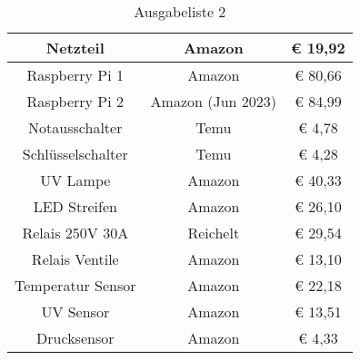 \begin{table}[H]
\vspace{10mm}
    \centering
    \begin{tabular}{ | c | c | c | } 
  \hline
   Netzteil	&Amazon	&€ 19,92\\ 
\hline
 Raspberry Pi 1	&Amazon	&€ 80,66 \\ 
  \hline
  Raspberry Pi 2	&Amazon (Jun 2023)	&€ 84,99\\ 
  \hline
   Notausschalter	&Temu	&€ 4,78\\ 
  \hline
 Schlüsselschalter	&Temu	&€ 4,28\\ 
  \hline
 UV Lampe	&Amazon	&€ 40,33 \\ 
  \hline
 LED Streifen	&Amazon&	€ 26,10\\ 
  \hline
    Relais 250V 30A	&Reichelt	&€ 29,54 \\ 
  \hline
  Relais Ventile&	Amazon	&€ 13,10\\ 
  \hline
  Temperatur Sensor	&Amazon	&€ 22,18 \\ 
  \hline
  UV Sensor	&Amazon	&€ 13,51\\ 
  \hline
  Drucksensor	&Amazon	&€ 4,33 \\ 
  \hline
\end{tabular}
    \caption{Ausgabeliste 2}
\end{table}
\vspace{5mm}
